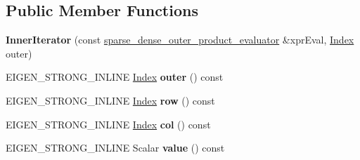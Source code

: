 \subsection*{Public Member Functions}
\begin{DoxyCompactItemize}
\item 
\mbox{\label{class_eigen_1_1internal_1_1sparse__dense__outer__product__evaluator_1_1_inner_iterator_a27bb5136a9ef5370c7ddfc34ddc11999}} 
{\bfseries Inner\+Iterator} (const \hyperlink{struct_eigen_1_1internal_1_1sparse__dense__outer__product__evaluator}{sparse\+\_\+dense\+\_\+outer\+\_\+product\+\_\+evaluator} \&xpr\+Eval, \hyperlink{namespace_eigen_a62e77e0933482dafde8fe197d9a2cfde}{Index} outer)
\item 
\mbox{\label{class_eigen_1_1internal_1_1sparse__dense__outer__product__evaluator_1_1_inner_iterator_a18b2d7ab3c90d856a45862d0e62d5728}} 
E\+I\+G\+E\+N\+\_\+\+S\+T\+R\+O\+N\+G\+\_\+\+I\+N\+L\+I\+NE \hyperlink{namespace_eigen_a62e77e0933482dafde8fe197d9a2cfde}{Index} {\bfseries outer} () const
\item 
\mbox{\label{class_eigen_1_1internal_1_1sparse__dense__outer__product__evaluator_1_1_inner_iterator_ac58c9e2ff400cb2741d955912f0068df}} 
E\+I\+G\+E\+N\+\_\+\+S\+T\+R\+O\+N\+G\+\_\+\+I\+N\+L\+I\+NE \hyperlink{namespace_eigen_a62e77e0933482dafde8fe197d9a2cfde}{Index} {\bfseries row} () const
\item 
\mbox{\label{class_eigen_1_1internal_1_1sparse__dense__outer__product__evaluator_1_1_inner_iterator_a484b491863396b0585940f6ffadcedd2}} 
E\+I\+G\+E\+N\+\_\+\+S\+T\+R\+O\+N\+G\+\_\+\+I\+N\+L\+I\+NE \hyperlink{namespace_eigen_a62e77e0933482dafde8fe197d9a2cfde}{Index} {\bfseries col} () const
\item 
\mbox{\label{class_eigen_1_1internal_1_1sparse__dense__outer__product__evaluator_1_1_inner_iterator_a26f411b74ba4a10ae4d254423c0b800a}} 
E\+I\+G\+E\+N\+\_\+\+S\+T\+R\+O\+N\+G\+\_\+\+I\+N\+L\+I\+NE Scalar {\bfseries value} () const

\end{DoxyCompactItemize}
